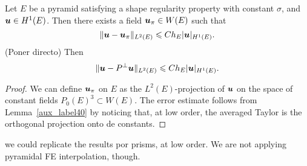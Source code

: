 \begin{proposition}\label{propupi}
Let $E$ be a pyramid satisfying a shape regularity property with constant $\sigma$, and $\boldsymbol{u}\in H^1(E)$. 
Then there exists a field $\boldsymbol{u}_\pi\in W(E)$ such that
\[
\|\boldsymbol{u}-\boldsymbol{u}_\pi\|_{L^2(E)}\leqslant C h_E|\boldsymbol{u}|_{H^1(E)}.
\]
(Poner directo) Then
\[
\|\boldsymbol{u}-P^{\perp}\boldsymbol{u}\|_{L^2(E)}\leqslant C h_E|\boldsymbol{u}|_{H^1(E)}.
\]
\end{proposition}
\begin{proof}
We can define $\boldsymbol{u}_\pi$ on $E$ as the $L^2(E)$-projection of $\boldsymbol{u}$ on the space
of constant fields $P_0(E)^3\subset W(E)$. The error estimate follows from 
Lemma~\ref{aux_label40}	
by noticing that, at low order, the averaged Taylor is the orthogonal projection
onto de constants.
\end{proof}
\begin{remark}
  we could replicate the results por prisms, at low order. We are not
  applying pyramidal FE interpolation, though.
\end{remark}